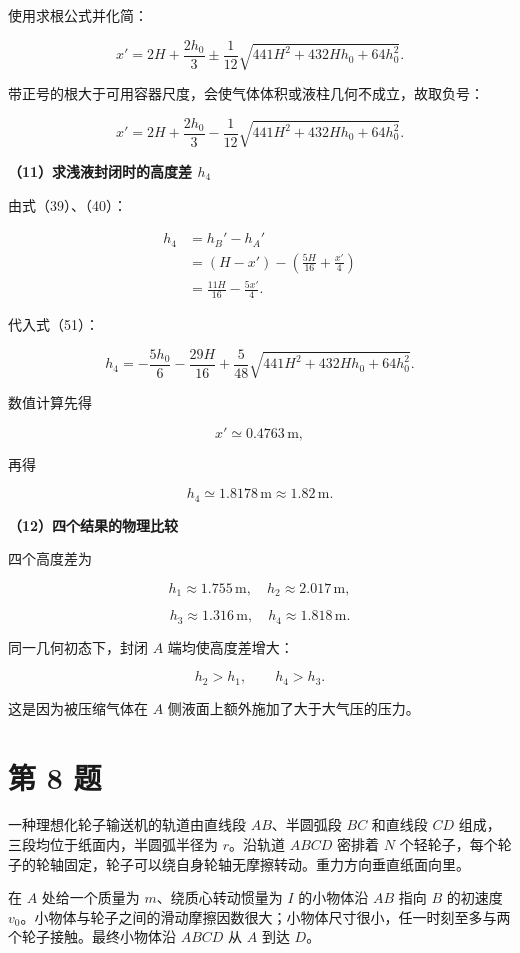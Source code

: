 \documentclass[12pt,a4paper,UTF8]{ctexart}
\begin{document}
使用求根公式并化简：

\[
x'
=2H+\frac{2h_0}{3}
\pm\frac1{12}
\sqrt{441H^2+432Hh_0+64h_0^2}.
\tag{50}
\]

带正号的根大于可用容器尺度，会使气体体积或液柱几何不成立，故取负号：

\[
\boxed{
x'
=2H+\frac{2h_0}{3}
-\frac1{12}
\sqrt{441H^2+432Hh_0+64h_0^2}
}.
\tag{51}
\]

\textbf{（11）求浅液封闭时的高度差 \(h_4\)}

由式（39）、（40）：

\[
\begin{aligned}
h_4
&=h_B'-h_A'\\
&=(H-x')-\left(\frac{5H}{16}+\frac{x'}4\right)\\
&=\frac{11H}{16}-\frac{5x'}4.
\end{aligned}
\tag{52}
\]

代入式（51）：

\[
\boxed{
h_4
=-\frac{5h_0}{6}-\frac{29H}{16}
+\frac5{48}
\sqrt{441H^2+432Hh_0+64h_0^2}
}.
\tag{53}
\]

数值计算先得

\[
x'\simeq0.4763\,\mathrm m,
\]

再得

\[
\boxed{h_4\simeq1.8178\,\mathrm m\approx1.82\,\mathrm m}.
\tag{54}
\]

\textbf{（12）四个结果的物理比较}

四个高度差为

\[
h_1\approx1.755\,\mathrm m,
\quad
h_2\approx2.017\,\mathrm m,
\]

\[
h_3\approx1.316\,\mathrm m,
\quad
h_4\approx1.818\,\mathrm m.
\]

同一几何初态下，封闭 \(A\) 端均使高度差增大：

\[
h_2>h_1,
\qquad
h_4>h_3.
\]

这是因为被压缩气体在 \(A\) 侧液面上额外施加了大于大气压的压力。

\newpage

\section{第 8 题}\label{ux7b2c-8-ux9898}

一种理想化轮子输送机的轨道由直线段 \(AB\)、半圆弧段 \(BC\) 和直线段
\(CD\) 组成，三段均位于纸面内，半圆弧半径为 \(r\)。沿轨道 \(ABCD\)
密排着 \(N\)
个轻轮子，每个轮子的轮轴固定，轮子可以绕自身轮轴无摩擦转动。重力方向垂直纸面向里。

在 \(A\) 处给一个质量为 \(m\)、绕质心转动惯量为 \(I\) 的小物体沿 \(AB\)
指向 \(B\) 的初速度
\(v_0\)。小物体与轮子之间的滑动摩擦因数很大；小物体尺寸很小，任一时刻至多与两个轮子接触。最终小物体沿
\(ABCD\) 从 \(A\) 到达 \(D\)。
\end{document}
